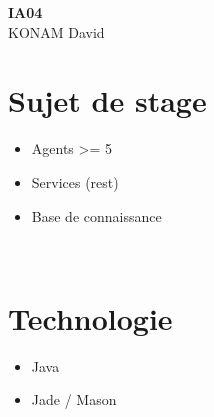 \documentclass[11pt,fleqn]{book}
\begin{document}
\begingroup
\thispagestyle{empty}
\centering
\vspace*{5cm}
\par\normalfont\fontsize{35}{35}\sffamily\selectfont
\vspace*{2cm}
\textbf{IA04}\
~\\
{\Huge KONAM David}\par %
\endgroup
{} %
							\pagestyle{empty} %
							\tableofcontents %
							\pagestyle{fancy} %
								\chapter{Sujet de stage}
\begin{itemize}
\item Agents  >=  5
\item Services  (rest)
\item Base  de  connaissance
\end{itemize}
~\\
								\chapter{Technologie}
\begin{itemize}
\item Java
\item Jade  /  Mason
\end{itemize}
~\\
\end{document}
